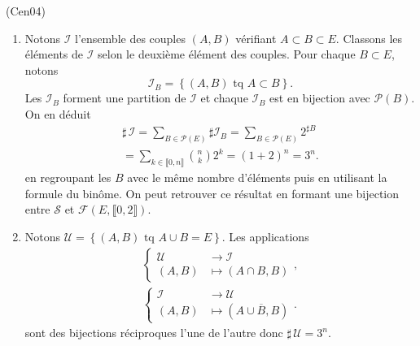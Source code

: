 \begin{tiny}(Cen04)\end{tiny} 
\begin{enumerate}
  \item Notons $\mathcal{I}$ l'ensemble des couples $(A,B)$ vérifiant $A\subset B \subset E$.\newline
Classons les éléments de $\mathcal{I}$ selon le deuxième élément des couples. Pour chaque $B \subset E$, notons
\[
  \mathcal{I}_B =
  \left\lbrace (A,B) \text{ tq } A \subset B \right\rbrace.
\]
Les $\mathcal{I}_B$ forment une partition de $\mathcal{I}$ et chaque $\mathcal{I}_B$ est en bijection avec $\mathcal{P}(B)$. On en déduit
\begin{multline*}
\sharp\, \mathcal{I} =  \sum_{B \in \mathcal{P}(E)} \sharp \mathcal{I}_B
 = \sum_{B \in \mathcal{P}(E)} 2^{\sharp B}\\
 = \sum_{k \in \llbracket 0,n\rrbracket} \binom{n}{k} 2^k 
 = (1+2)^n = 3^n.
\end{multline*}
en regroupant les $B$ avec le même nombre d'éléments puis en utilisant la formule du binôme.\newline
On peut retrouver ce résultat en formant une bijection entre $\mathcal{S}$ et $\mathcal{F}(E,\llbracket 0,2 \rrbracket)$.

  \item Notons $\mathcal{U}= \left\lbrace (A,B) \text{ tq } A\cup B = E\right\rbrace$. Les applications
\begin{multline*}
\left\lbrace
  \begin{aligned}
    \mathcal{U} &\rightarrow \mathcal{I} \\
    (A,B)       &\mapsto (A\cap B, B)
  \end{aligned}
\right., \\
\left\lbrace
  \begin{aligned}
    \mathcal{I} &\rightarrow \mathcal{U} \\
    (A,B) &\mapsto (A \cup \overline{B},B)
  \end{aligned}
\right..
\end{multline*}
sont des bijections réciproques l'une de l'autre donc $\sharp\, \mathcal{U} = 3^n$.
\end{enumerate}

